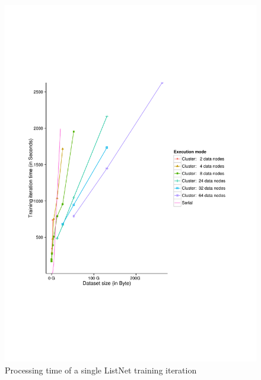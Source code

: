 \begin{figure}
\centering
\includegraphics[trim=0cm 5cm 0cm 5cm, scale=0.8]{gfx/time_single.pdf}
\caption{Processing time of a single ListNet training iteration}
\label{fig:listnet_train_time}
\end{figure}

